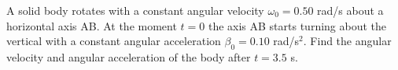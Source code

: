 
\item A solid body rotates with a constant angular velocity \(\omega_0 = 0.50\) rad/s about a horizontal axis AB. At the moment \(t = 0\) the axis AB starts turning about the vertical with a constant angular acceleration \(\beta_0 = 0.10\) rad/s\(^2\). Find the angular velocity and angular acceleration of the body after \(t = 3.5\) s.
